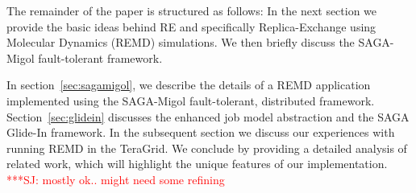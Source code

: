 \documentclass{rspublic}
\newcommand{\jhanote}[1]{ {\textcolor{red} { ***SJ: #1 }}}
\newcommand{\jhanote}[1]{}
\begin{document}

The remainder of the paper is structured as follows: In the next
section we provide the basic ideas behind RE and specifically
Replica-Exchange using Molecular Dynamics (REMD) simulations.  We then
briefly discuss the SAGA-Migol fault-tolerant framework. 

In section~\ref{sec:sagamigol}, we describe the details of a REMD
application implemented using the SAGA-Migol fault-tolerant,
distributed framework. Section~\ref{sec:glidein} discusses the
enhanced job model abstraction and the SAGA Glide-In framework. In the
subsequent section we discuss our experiences with running REMD in the
TeraGrid.  We conclude by providing a detailed analysis of related
work, which will highlight the unique features of our implementation.
\jhanote{mostly ok.. might need some refining}
\end{document}

